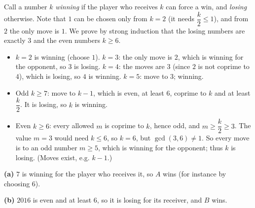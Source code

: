 Call a number $k$ \emph{winning} if the player who receives $k$ can force a win, and \emph{losing} otherwise. Note that $1$ can be chosen only from $k=2$ (it needs $\dfrac {k}{2}\le1$), and from $2$ the only move is $1$. We prove by strong induction that the losing numbers are exactly $3$ and the even numbers $k\ge6$.
\begin{itemize}
\item $k=2$ is winning (choose $1$). $k=3$: the only move is $2$, which is winning for the opponent, so $3$ is losing. $k=4$: the moves are $3$ (since $2$ is not coprime to $4$), which is losing, so $4$ is winning. $k=5$: move to $3$; winning.
\item Odd $k\ge7$: move to $k-1$, which is even, at least $6$, coprime to $k$ and at least $\dfrac {k}{2}$. It is losing, so $k$ is winning.
\item Even $k\ge6$: every allowed $m$ is coprime to $k$, hence odd, and $m\ge\dfrac {k}{2}\ge3$. The value $m=3$ would need $k\le6$, so $k=6$, but $\gcd(3,6)\ne1$. So every move is to an odd number $m\ge5$, which is winning for the opponent; thus $k$ is losing. (Moves exist, e.g. $k-1$.)
\end{itemize}
\textbf{(a)} $7$ is winning for the player who receives it, so $\boxed{A}$ wins (for instance by choosing $6$).

\textbf{(b)} $2016$ is even and at least $6$, so it is losing for its receiver, and $\boxed{B}$ wins.
